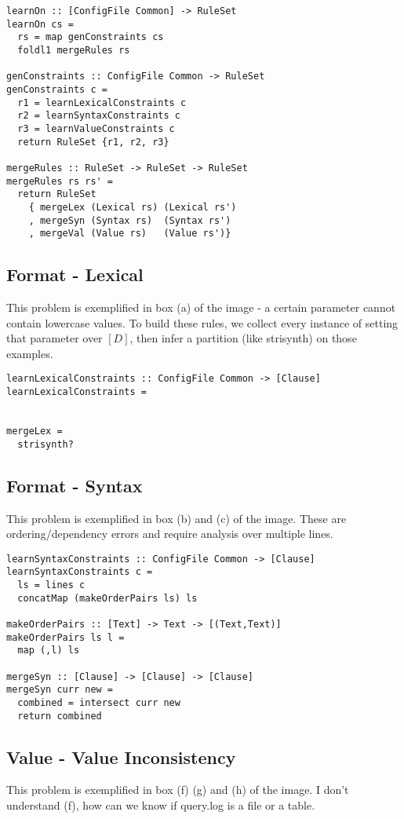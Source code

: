 \documentclass{article}
\begin{document}
\begin{lstlisting}
learnOn :: [ConfigFile Common] -> RuleSet
learnOn cs = 
  rs = map genConstraints cs
  foldl1 mergeRules rs

genConstraints :: ConfigFile Common -> RuleSet
genConstraints c =
  r1 = learnLexicalConstraints c
  r2 = learnSyntaxConstraints c
  r3 = learnValueConstraints c
  return RuleSet {r1, r2, r3}

mergeRules :: RuleSet -> RuleSet -> RuleSet
mergeRules rs rs' =
  return RuleSet
    { mergeLex (Lexical rs) (Lexical rs')
    , mergeSyn (Syntax rs)  (Syntax rs')
    , mergeVal (Value rs)   (Value rs')}
\end{lstlisting}



\subsection{Format - Lexical}
This problem is exemplified in box (a) of the image - a certain parameter cannot contain lowercase values.
To build these rules, we collect every instance of setting that parameter over $[D]$, then infer a partition (like strisynth) on those examples.

\begin{lstlisting}
learnLexicalConstraints :: ConfigFile Common -> [Clause]
learnLexicalConstraints =
  

mergeLex =
  strisynth?
\end{lstlisting}

\subsection{Format - Syntax}
This problem is exemplified in box (b) and (c) of the image.
These are ordering/dependency errors and require analysis over multiple lines.

\begin{lstlisting}
learnSyntaxConstraints :: ConfigFile Common -> [Clause]
learnSyntaxConstraints c =
  ls = lines c
  concatMap (makeOrderPairs ls) ls
  
makeOrderPairs :: [Text] -> Text -> [(Text,Text)]
makeOrderPairs ls l = 
  map (,l) ls

mergeSyn :: [Clause] -> [Clause] -> [Clause]
mergeSyn curr new =
  combined = intersect curr new
  return combined
\end{lstlisting}

\subsection{Value - Value Inconsistency}
This problem is exemplified in box (f) (g) and (h) of the image.
I don't understand (f), how can we know if query.log is a file or a table.
\end{document}
